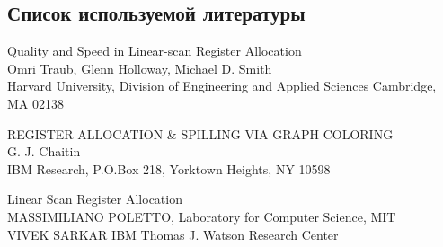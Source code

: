 \subsection{ Список используемой литературы}
\begin{my_enumerate}


\item Quality and Speed in Linear-scan Register Allocation \\
Omri Traub, Glenn Holloway, Michael D. Smith \\
Harvard University, Division of Engineering and Applied Sciences Cambridge, MA 02138 \\

\item REGISTER ALLOCATION \& SPILLING VIA GRAPH COLORING \\
G. J. Chaitin \\
IBM Research, P.O.Box 218, Yorktown Heights, NY 10598 \\

\item Linear Scan Register Allocation \\
MASSIMILIANO POLETTO, Laboratory for Computer Science, MIT \\
VIVEK SARKAR IBM Thomas J. Watson Research Center \\

\end{my_enumerate}

